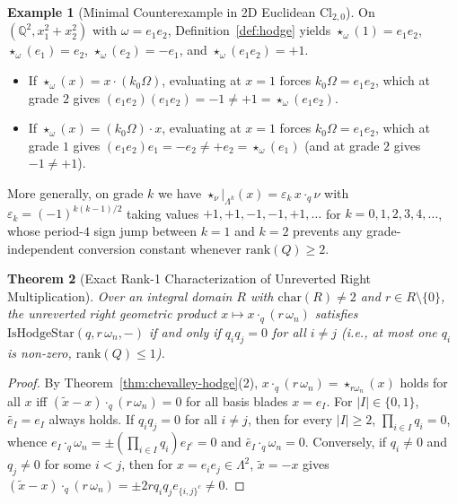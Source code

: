 \documentclass[11pt]{article}
\newtheorem{theorem}{Theorem}[section]
\theoremstyle{definition}
\newtheorem{example}[theorem]{Example}
\newcommand{\Cl}{\mathrm{Cl}}
\newcommand{\rk}{\mathrm{rank}}
\begin{document}
\begin{example}[Minimal Counterexample in 2D Euclidean $\Cl_{2,0}$]\label{ex:cl20}
On $(\mathbb{Q}^2, x_1^2 + x_2^2)$ with $\omega = e_1 e_2$, Definition~\ref{def:hodge} yields $\star_\omega(1) = e_1 e_2$, $\star_\omega(e_1) = e_2$, $\star_\omega(e_2) = -e_1$, and $\star_\omega(e_1 e_2) = +1$.
\begin{itemize}
  \item If $\star_\omega(x) = x\cdot(k_0\Omega)$, evaluating at $x=1$ forces $k_0\Omega = e_1 e_2$, which at grade $2$ gives $(e_1 e_2)(e_1 e_2) = -1 \neq +1 = \star_\omega(e_1 e_2)$.
  \item If $\star_\omega(x) = (k_0\Omega)\cdot x$, evaluating at $x=1$ forces $k_0\Omega = e_1 e_2$, which at grade $1$ gives $(e_1 e_2)e_1 = -e_2 \neq +e_2 = \star_\omega(e_1)$ (and at grade $2$ gives $-1 \neq +1$).
\end{itemize}
More generally, on grade $k$ we have $\star_\nu|_{\Lambda^k}(x) = \varepsilon_k\,x\cdot_q\nu$ with $\varepsilon_k = (-1)^{k(k-1)/2}$ taking values $+1, +1, -1, -1, +1, \dots$ for $k = 0, 1, 2, 3, 4, \dots$, whose period-$4$ sign jump between $k=1$ and $k=2$ prevents any grade-independent conversion constant whenever $\rk(Q) \ge 2$.
\end{example}

\begin{theorem}[Exact Rank-1 Characterization of Unreverted Right Multiplication]\label{thm:rank-one}
Over an integral domain $R$ with $\mathrm{char}(R) \neq 2$ and $r \in R \setminus \{0\}$, the unreverted right geometric product $x \mapsto x\cdot_q (r\,\omega_n)$ satisfies $\mathrm{IsHodgeStar}(q, r\,\omega_n, -)$ if and only if $q_i q_j = 0$ for all $i \neq j$ (i.e., at most one $q_i$ is non-zero, $\rk(Q) \le 1$).
\end{theorem}
\begin{proof}
By Theorem~\ref{thm:chevalley-hodge}(2), $x\cdot_q(r\,\omega_n) = \star_{r\omega_n}(x)$ holds for all $x$ iff $(\widetilde{x} - x)\cdot_q(r\,\omega_n) = 0$ for all basis blades $x = e_I$. For $|I| \in \{0,1\}$, $\widetilde{e_I} = e_I$ always holds. If $q_i q_j = 0$ for all $i \neq j$, then for every $|I| \ge 2$, $\prod_{i \in I} q_i = 0$, whence $e_I\cdot_q \omega_n = \pm(\prod_{i\in I} q_i)e_{I^c} = 0$ and $\widetilde{e_I}\cdot_q\omega_n = 0$. Conversely, if $q_i \neq 0$ and $q_j \neq 0$ for some $i < j$, then for $x = e_i e_j \in \Lambda^2$, $\widetilde{x} = -x$ gives $(\widetilde{x}-x)\cdot_q(r\,\omega_n) = \pm 2 r q_i q_j e_{\{i,j\}^c} \neq 0$.
\end{proof}
\end{document}
